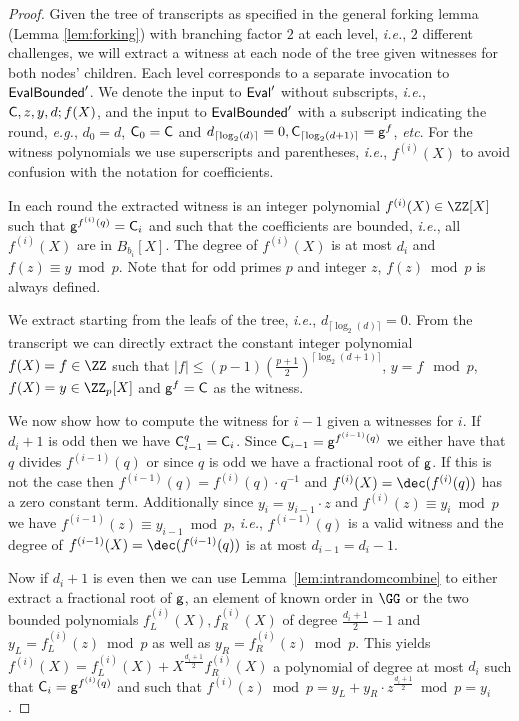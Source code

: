 \documentclass{article}
\theoremstyle{definition}
\begin{document}
\begin{proof}
Given the tree of transcripts as specified in the general forking lemma (Lemma \ref{lem:forking})  with branching factor $2$ at each level, \emph{i.e.}, $2$ different challenges, we will extract a witness at each node of the tree given witnesses for both nodes' children. Each level corresponds to a separate invocation to $\textsf{{EvalBounded}}'$. We denote the input to $\textsf{{Eval}}'$ without subscripts, \emph{i.e.}, $\mathsf{C},z,y,d;f(X)$, and the input to $\textsf{{EvalBounded}}'$ with a subscript indicating the round, \emph{e.g.}, $d_0=d$, $\mathsf{C}_0=\mathsf{C}$ and $d_{\lceil \log_2(d)\rceil }=0,\mathsf{C}_{\lceil \log_2(d+1)\rceil }=\mathsf{g}^{f}$, \emph{etc}. For the witness polynomials we use superscripts and parentheses, \emph{i.e.}, $f^{(i)}(X)$ to avoid confusion with the notation for coefficients.  

In each round the extracted witness is an integer polynomial $f^{(i)}(X)\in \ZZ[X]$ such that $\mathsf{g}^{f^{(i)}(q)}=\mathsf{C}_i$ and such that the coefficients are bounded, \emph{i.e.}, all $f^{(i)}(X)$ are in $B_{b_i}[X]$. The degree of $f^{(i)}(X)$ is at most $d_i$ and $f(z) \equiv y \bmod p$. Note that for odd primes $p$ and integer $z$, $f(z)\bmod p$ is always defined.

We extract starting from the leafs of the tree, \emph{i.e.}, $d_{\lceil \log_2(d)\rceil}=0$. From the transcript we can directly extract the constant integer polynomial $f(X)=f \in \ZZ$ such that $\vert f \vert \leq(p-1) (\frac{p+1}{2})^{\lceil \log_2(d+1)\rceil}$, $y=f \mod p$, $f(X)=y\in \ZZ_p[X]$ and $\mathsf{g}^{f}=\mathsf{C}$ as the witness.

We now show how to compute the witness for $i-1$ given a witnesses for $i$. 
If $d_i+1$ is odd then we have $\mathsf{C}_{i-1}^q=\mathsf{C}_i$. Since $\mathsf{C}_{i-1}=\mathsf{g}^{f^{(i-1)}(q)}$ we either have that $q$ divides $f^{(i-1)}(q)$ or since $q$ is odd we have a fractional root of $\mathsf{g}$. 
If this is not the case then $f^{(i-1)}(q)=f^{(i)}(q)\cdot q^{-1}$ and $f^{(i)}(X)=\dec(f^{(i)}(q))$ has a zero constant term. Additionally since $y_i=y_{i-1}\cdot z$ and $f^{(i)}(z)\equiv y_i \bmod p$ we have $f^{(i-1)}(z)\equiv y_{i-1} \bmod p$, \emph{i.e.}, $f^{(i-1)}(q)$ is a valid witness and the degree of $f^{(i-1)}(X)=\dec(f^{(i-1)}(q))$ is at most $d_{i-1}=d_i-1$. 

Now if $d_i+1$ is even then we can use Lemma~\ref{lem:intrandomcombine} to either extract a fractional root of $\mathsf{g}$, an element of known order in $\GG$ or the two bounded polynomials $f_{L}^{(i)}(X),f_{R}^{(i)}(X)$ of degree $\frac{d_i+1}{2}-1$ and $y_L=f_{L}^{(i)}(z)\bmod p$ as well as $y_R=f_{R}^{(i)}(z)\bmod p$. 
This yields $f^{(i)}(X)=f_{L}^{(i)}(X)+X^{\frac{d_i+1}{2}} f_{R}^{(i)}(X)$ a polynomial of degree at most $d_i$ such that $\mathsf{C}_i=\mathsf{g}^{f^{(i)}(q)}$ and such that $f^{(i)}(z) \bmod p=y_L+y_R \cdot z^{\frac{d_i+1}{2}}\bmod p=  y_i$.


\end{proof}
\end{document}
